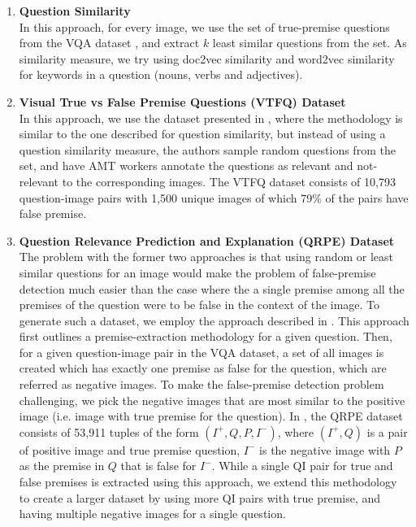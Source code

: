 \begin{enumerate}

\item \textbf{Question Similarity} \\[-10pt]

In this approach, for every image, we use the set of true-premise questions from the VQA dataset \cite{AntolALMBZP15}, and extract $k$ least similar questions from the set. As similarity measure, we try using doc2vec similarity and word2vec similarity for keywords in a question (nouns, verbs and adjectives). \\[-10pt]

\item \textbf{Visual True vs False Premise Questions (VTFQ) Dataset} \\[-10pt]

In this approach, we use the dataset presented in \cite{ray2016question}, where the methodology is similar to the one described for question similarity, but instead of using a question similarity measure, the authors sample random questions from the set, and have AMT workers annotate the questions as relevant and not-relevant to the corresponding images. The VTFQ dataset consists of 10,793 question-image pairs with 1,500 unique images of which 79\% of the pairs have false premise. \\[-10pt]

\item \textbf{Question Relevance Prediction and Explanation (QRPE) Dataset} \\[-10pt]

The problem with the former two approaches is that using random or least similar questions for an image would make the problem of false-premise detection much easier than the case where the a single premise among all the premises of the question were to be false in the context of the image. To generate such a dataset, we employ the approach described in \cite{mahendru2017promise}. This approach first outlines a premise-extraction methodology for a given question. Then, for a given question-image pair in the VQA dataset, a set of all images is created which has exactly one premise as false for the question, which are referred as negative images. To make the false-premise detection problem challenging, we pick the negative images that are most similar to the positive image (i.e. image with true premise for the question). In \cite{AntolALMBZP15}, the QRPE dataset consists of 53,911 tuples of the form $(I^+, Q, P, I^-)$, where $(I^+, Q)$ is a pair of positive image and true premise question, $I^-$ is the negative image with $P$ as the premise in $Q$ that is false for $I^-$. While a single QI pair for true and false premises is extracted using this approach, we extend this methodology to create a larger dataset by using more QI pairs with true premise, and having multiple negative images for a single question.

\end{enumerate}

